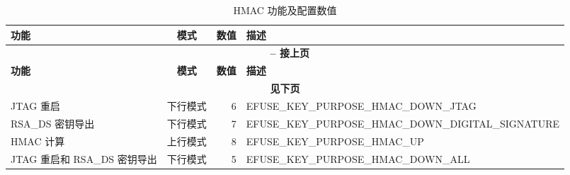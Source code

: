 \begin{longtable}[c]{|p{2cm}|c|r|p{9.5cm}|}
\caption{HMAC 功能及配置数值}
\label{tab:hmac-key-purpose}
\\    \hline
    \rowcolor{lightgray}
    \textbf{功能} & \textbf{模式} & \textbf{数值} & \textbf{描述} \\\hline
    \endfirsthead
    
    \multicolumn{4}{c}{\bfseries \tablename\ \thetable{} -- 接上页}\\\hline
    
    \rowcolor{lightgray}
    \textbf{功能} & \textbf{模式} & \textbf{数值} & \textbf{描述} \\\hline
    \endhead
    \multicolumn{4}{c}{\textbf{见下页}}\\
    \endfoot
    \endlastfoot
    \hline
    
    JTAG 重启 & 下行模式 & 6 & EFUSE\_KEY\_PURPOSE\_HMAC\_DOWN\_JTAG \\
    \hline
    RSA\_DS 密钥导出 & 下行模式 & 7 & EFUSE\_KEY\_PURPOSE\_HMAC\_DOWN\_DIGITAL\_SIGNATURE \\
    \hline
    HMAC 计算 & 上行模式 & 8 & EFUSE\_KEY\_PURPOSE\_HMAC\_UP \\    
    \hline
    JTAG 重启和 RSA\_DS 密钥导出 & 下行模式 & 5 & EFUSE\_KEY\_PURPOSE\_HMAC\_DOWN\_ALL \\
    \hline
\end{longtable}
